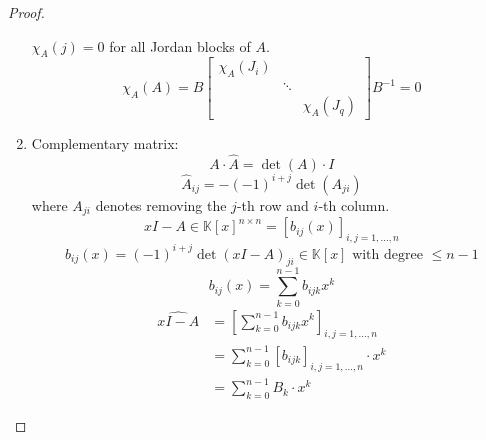 \documentclass{article}
\numberwithin{lecref}{section}
\begin{document}
\begin{proof}
\begin{enumerate}
      $\chi_A(j) = 0$ for all Jordan blocks of $A$.
      \[ \chi_A(A) = B \begin{bmatrix} \chi_A(J_i) & & \\ & \ddots & \\ & & \chi_A(J_q) \end{bmatrix} B^{-1} = 0 \]
    \item {} Complementary matrix:
      \[ A \cdot \widehat{A} = \det(A) \cdot I \]
      \[ \widehat{A}_{ij} = -(-1)^{i+j} \det(A_{ji}) \]
      where $A_{ji}$ denotes removing the $j$-th row and $i$-th column.
      \[ \widehat{xI - A} \in \mathbb K[x]^{n \times n} = [b_{ij}(x)]_{i,j=1,\dots,n} \]
      \[ b_{ij}(x) = (-1)^{i+j} \det(xI - A)_{ji} \in \mathbb K[x] \text{ with degree } \leq n-1 \]
      \[ b_{ij}(x) = \sum_{k=0}^{n-1} b_{ijk} x^k \]
      \begin{align*}
        \widehat{xI - A} &= \left[\sum_{k=0}^{n-1} b_{ijk} x^k\right]_{i,j=1,\dots,n} \\
          &= \sum_{k=0}^{n-1} [b_{ijk}]_{i,j=1,\dots,n} \cdot x^k \\
          &= \sum_{k=0}^{n-1} B_k \cdot x^k
      \end{align*}


\end{enumerate}
\end{proof}
\end{document}
